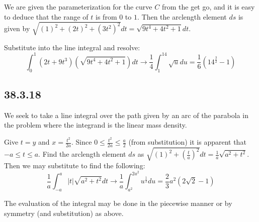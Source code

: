 \documentclass{article}
\begin{document}
We are given the parameterization for the curve $C$ from the get go, and it is easy to deduce that the range of $t$ is from $0$ to $1$. Then the arclength element $ds$ is given by $\sqrt{(1)^2 + (2t)^2 + (3t^2)^2}dt = \sqrt{9t^4 + 4t^2 + 1}dt$.

Substitute into the line integral and resolve:
$$\int_0^1 (2t + 9t^3)(\sqrt{9t^4 + 4t^2 + 1})dt \to \frac{1}{4}\int_1^{14}\sqrt{u}du = \frac{1}{6}\left(14^{\frac{3}{2}}-1\right)$$

\subsection{38.3.18}

We seek to take a line integral over the path given by an arc of the parabola in the problem where the integrand is the linear mass density.

Give $t=y$ and $x = \frac{t^2}{2a}$. Since $0\leq \frac{t^2}{2a} \leq \frac{a}{2}$ (from substitution) it is apparent that $-a\leq t \leq a$. Find the arclength element $ds$ as $\sqrt{(1)^2 + \left(\frac{t}{a}\right)^2}dt = \frac{1}{a}\sqrt{a^2+t^2}$. Then we may substitute to find the following:
$$\frac{1}{a}\int_{-a}^a |t|\sqrt{a^2+t^2} dt \to \frac{1}{a}\int_{a^2}^{2a^2}u^{\frac{1}{2}}du = \frac{2}{3}a^2(2\sqrt{2}-1)$$


The evaluation of the integral may be done in the piecewise manner or by symmetry (and substitution) as above.
\end{document}
